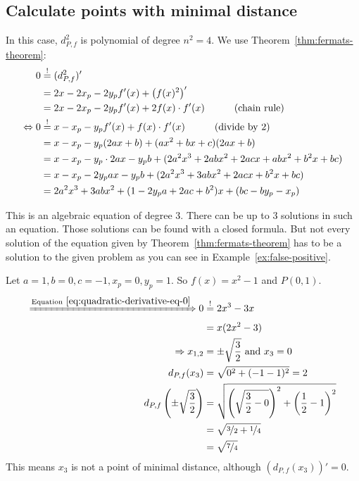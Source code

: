 \subsection{Calculate points with minimal distance}
In this case, $d_{P,f}^2$ is polynomial of degree $n^2 = 4$.
We use Theorem~\ref{thm:fermats-theorem}:\nobreak
\begin{align}
    0     &\overset{!}{=} (d_{P,f}^2)'\\
          &= 2x -2 x_p -2y_p f'(x) + \left (f(x)^2 \right )'\\
          &= 2x -2 x_p -2y_p f'(x) + 2 f(x) \cdot f'(x) \rlap{\hspace*{3em}(chain rule)}\label{eq:minimizingFirstDerivative}\\
\Leftrightarrow 0 &\overset{!}{=} x -x_p -y_p f'(x) + f(x) \cdot f'(x) \rlap{\hspace*{3em}(divide by 2)}\label{eq:minimizingFirstDerivative}\\
          &= x -x_p -y_p (2ax+b) + (ax^2+bx+c)(2ax+b)\\
          &= x -x_p -y_p \cdot 2ax- y_p b + (2 a^2 x^3+2 a b x^2+2 a c x+ab x^2+b^2 x+bc)\\
          &= x -x_p -2y_p ax- y_p b + (2a^2 x^3 + 3 ab x^2 + 2acx + b^2 x + bc)\\
          &= 2a^2 x^3 + 3 ab x^2 + (1 -2y_p a+ 2ac + b^2)x +(bc-by_p-x_p)\label{eq:quadratic-derivative-eq-0}
\end{align}

This is an algebraic equation of degree 3.
There can be up to 3 solutions in such an equation. Those solutions
can be found with a closed formula. But not every solution of the
equation given by Theorem~\ref{thm:fermats-theorem}
has to be a solution to the given problem as you can see in
Example~\ref{ex:false-positive}.
\goodbreak
\begin{example}\label{ex:false-positive}
    Let $a = 1,  b = 0,  c=-1, x_p= 0, y_p = 1$.
    So $f(x) = x^2 - 1$ and $P(0, 1)$.
    \begin{align}
        \xRightarrow{\text{Equation}~\ref{eq:quadratic-derivative-eq-0}} 0 &\stackrel{!}{=} 2x^3 - 3x\\
        &= x(2x^2-3)\\
        \Rightarrow x_{1,2} &= \pm \sqrt{\frac{3}{2}} \text{ and } x_3 = 0\\
        d_{P,f}(x_3) &= \sqrt{0^2 + (-1-1)^2} = 2\\
        d_{P,f} \left (\pm \sqrt{\frac{3}{2}} \right ) &= \sqrt{\left (\sqrt{\frac{3}{2} - 0} \right )^2 + \left (\frac{1}{2}-1 \right )^2}\\
            &= \sqrt{\nicefrac{3}{2}+\nicefrac{1}{4}} \\
            &= \sqrt{\nicefrac{7}{4}}\\
    \end{align}
    This means $x_3$ is not a point of minimal distance, although
    $(d_{P,f}(x_3))' = 0$.
\end{example}


